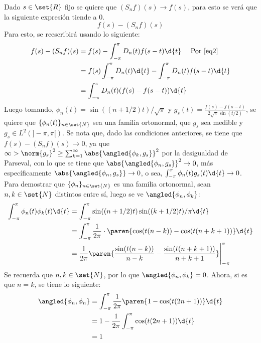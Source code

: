 \documentclass{homework}
\newcommand{\LP}{\ensuremath{L^2(]-\pi,\pi[)} }
\begin{document}
\begin{sol}[1.c]
    Dado \(s\in\set{R}\) fijo se quiere que \((S_n f)(s)\rightarrow f(s)\), para esto se verá que la siguiente expresión tiende a \(0\).
    \begin{equation}
        f(s)-(S_n f)(s)\label{eq4}
    \end{equation}
    Para esto, se reescribirá usando lo siguiente:
    \begin{align*}
        f(s)-(S_n f)(s)&=f(s)-\int_{-\pi}^\pi D_n(t)f(s-t)\d{t}\quad\text{ Por \eqref{eq2}}\\
        &=f(s)\int_{-\pi}^\pi D_n(t)\d{t}-\int_{-\pi}^\pi D_n(t)f(s-t)\d{t}\\
        &=\int_{-\pi}^\pi D_n(t)(f(s)-f(s-t))\d{t}
    \end{align*}
    Luego tomando, \(\phi_n(t)=\sin((n+1/2)t)/\sqrt{\pi}\) y \(g_s(t)=\frac{f(s)-f(s-t)}{2\sqrt{\pi}\sin(t/2)}\), se quiere que \(\{\phi_n(t)\}_{n\in\set{N}}\) sea una familia ortonormal, que \(g_s\) sea medible y \(g_s\in\LP\). Se nota que, dado las condiciones anteriores, se tiene que \(f(s)-(S_n f)(s)\rightarrow 0\), ya que \(\infty>\norm{g_s}^2\geq\sum_{k=1}^\infty\abs{\angled{\phi_k,g_s}}^2\) por la desigualdad de Parseval, con lo que se tiene que \(\abs{\angled{\phi_n,g_s}}^2\rightarrow 0\), más específicamente \(\abs{\angled{\phi_n,g_s}}\rightarrow 0\), o sea, \(\int_{-\pi}^\pi\phi_n(t)g_s(t)\d{t}\rightarrow 0\).\\
    Para demostrar que \(\{\phi_n\}_{n\in\set{N}}\) es una familia ortonormal, sean \(n,k\in\set{N}\) distintos entre sí, luego se ve \(\angled{\phi_n,\phi_k}\):
    \begin{align*}
        \int_{-\pi}^\pi\phi_n(t)\phi_k(t)\d{t}&=\int_{-\pi}^\pi\sin((n+1/2)t)\sin((k+1/2)t)/\pi\d{t}\\
        &=\int_{-\pi}^\pi\frac1{2\pi}\cdot\paren{\cos(t(n-k))-\cos(t(n+k+1))}\d{t}\\
        &=\frac1{2\pi}\paren{\frac{\sin(t(n-k))}{n-k}-\frac{\sin(t(n+k+1))}{n+k+1}}\Bigg|_{-\pi}^\pi
    \end{align*}
    Se recuerda que \(n,k\in\set{N}\), por lo que \(\angled{\phi_n,\phi_k}=0\). Ahora, si es que \(n=k\), se tiene lo siguiente:
    \begin{align*}
        \angled{\phi_n,\phi_n}&=\int_{-\pi}^\pi\frac1{2\pi}\paren{1-\cos(t(2n+1))}\d{t}\\
        &=1-\frac1{2\pi}\int_{-\pi}^\pi\cos(t(2n+1))\d{t}\\
        &=1
    \end{align*}

\end{sol}
\end{document}
